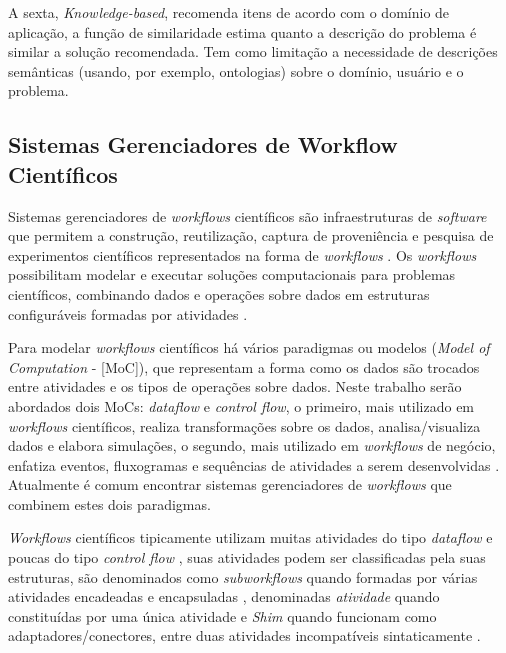 \documentclass{acm_proc_article-sp}
\begin{document}
A sexta, \emph{Knowledge-based}, recomenda itens de acordo com o dom{\'i}nio de aplica\c{c}{\~a}o, a fun\c{c}{\~a}o de similaridade estima quanto a descri\c{c}{\~a}o do problema {\'e} similar a solu\c{c}{\~a}o recomendada. Tem como limita\c{c}{\~a}o a necessidade de descri\c{c}{\~o}es sem{\^a}nticas (usando, por exemplo, ontologias) sobre o dom{\'i}nio, usu{\'a}rio e o problema.

\subsection{Sistemas Gerenciadores de Workflow Cient{\'i}ficos}\label{SISTEMASGERENCIADORESWORKFLOWCIENTIFICO}
Sistemas gerenciadores de \emph{workflows} cient{\'i}ficos s{\~a}o infraestruturas de \emph{software} que permitem a constru\c{c}{\~a}o, reutiliza\c{c}{\~a}o, captura de proveni{\^e}ncia e pesquisa de experimentos cient{\'i}ficos representados na forma de \emph{workflows} \cite{McPhillips2009}. Os \emph{workflows} possibilitam modelar e executar solu\c{c}{\~o}es computacionais para problemas cient{\'i}ficos, combinando dados e opera\c{c}{\~o}es sobre dados em estruturas configur{\'a}veis formadas por  atividades \cite{Garijo2014}.

Para modelar \emph{workflows} cient{\'i}ficos h{\'a} v{\'a}rios paradigmas ou modelos (\emph{Model of Computation} - [MoC]), que representam a forma como os dados s{\~a}o trocados entre atividades e os tipos de opera\c{c}{\~o}es sobre dados. Neste trabalho ser{\~a}o abordados dois MoCs: \emph{dataflow} e \emph{control flow}, o primeiro, mais utilizado em \emph{workflows} cient{\'i}ficos, realiza transforma\c{c}{\~o}es sobre os dados, analisa/visualiza dados e elabora simula\c{c}{\~o}es, o segundo, mais utilizado em \emph{workflows} de neg{\'o}cio, enfatiza eventos, fluxogramas e sequ{\^e}ncias de atividades a serem desenvolvidas \cite{Ludascher2006}. Atualmente {\'e} comum encontrar sistemas gerenciadores de \emph{workflows} que combinem estes dois paradigmas.

\emph{Workflows} cient{\'i}ficos tipicamente utilizam muitas atividades do tipo \emph{dataflow} e poucas do tipo \emph{control flow} \cite{Ludascher2006}, suas atividades podem ser classificadas pela suas estruturas, s{\~a}o denominados como \emph{subworkflows} quando formadas por v{\'a}rias atividades encadeadas e encapsuladas \cite{medeiros_woodss_2005}, denominadas \emph{atividade} quando constitu{\'i}das por uma {\'u}nica atividade \cite{Garijo2012} e \emph{Shim} quando funcionam como adaptadores/conectores, entre duas atividades incompat{\'i}veis sintaticamente \cite{Lin2009}.
\end{document}
